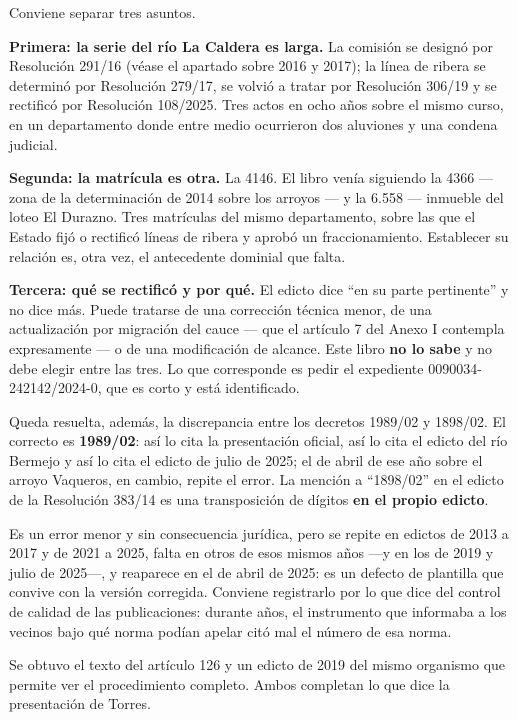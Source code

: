 \begin{cautela}
Conviene separar tres asuntos.

\textbf{Primera: la serie del río La Caldera es larga.} La comisión se designó por Resolución 291/16 (véase el apartado sobre 2016 y 2017); la línea de ribera se determinó por Resolución 279/17, se volvió a tratar por Resolución 306/19 y se rectificó por Resolución 108/2025. Tres actos en ocho años sobre el mismo curso, en un departamento donde entre medio ocurrieron dos aluviones y una condena judicial.

\textbf{Segunda: la matrícula es otra.} La 4146. El libro venía siguiendo la 4366 --- zona de la determinación de 2014 sobre los arroyos --- y la 6.558 --- inmueble del loteo El Durazno. Tres matrículas del mismo departamento, sobre las que el Estado fijó o rectificó líneas de ribera y aprobó un fraccionamiento. Establecer su relación es, otra vez, el antecedente dominial que falta.

\textbf{Tercera: qué se rectificó y por qué.} El edicto dice ``en su parte pertinente'' y no dice más. Puede tratarse de una corrección técnica menor, de una actualización por migración del cauce --- que el artículo 7 del Anexo I contempla expresamente --- o de una modificación de alcance. Este libro \textbf{no lo sabe} y no debe elegir entre las tres. Lo que corresponde es pedir el expediente 0090034-242142/2024-0, que es corto y está identificado.
\end{cautela}

Queda resuelta, además, la discrepancia entre los decretos 1989/02 y 1898/02. El correcto es \textbf{1989/02}: así lo cita la presentación oficial, así lo cita el edicto del río Bermejo y así lo cita el edicto de julio de 2025; el de abril de ese año sobre el arroyo Vaqueros, en cambio, repite el error. La mención a ``1898/02'' en el edicto de la Resolución 383/14 es una transposición de dígitos \textbf{en el propio edicto}.

Es un error menor y sin consecuencia jurídica, pero se repite en edictos de 2013 a 2017 y de 2021 a 2025, falta en otros de esos mismos años ---y en los de 2019 y julio de 2025---, y reaparece en el de abril de 2025: es un defecto de plantilla que convive con la versión corregida. Conviene registrarlo por lo que dice del control de calidad de las publicaciones: durante años, el instrumento que informaba a los vecinos bajo qué norma podían apelar citó mal el número de esa norma.

Se obtuvo el texto del artículo 126 y un edicto de 2019 del mismo organismo que permite ver el procedimiento completo. Ambos completan lo que dice la presentación de Torres.

